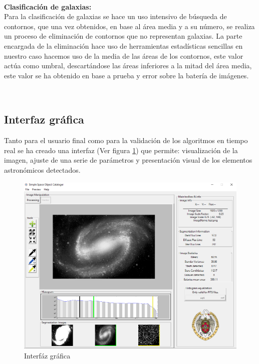 	\\
	\textbf{Clasificación de galaxias:}\\
	Para la clasificación de galaxias se hace un uso intensivo de búsqueda de contornos, que una vez obtenidos, en base al área media y a su número, se realiza un proceso de eliminación de contornos que no representan galaxias. La parte encargada de la eliminación hace uso de herramientas estadísticas sencillas en nuestro caso hacemos uso de la media de las áreas de los contornos, este valor actúa como umbral, descartándose las áreas inferiores a la mitad del área media, este valor se ha obtenido en base a prueba y error sobre la batería de imágenes.

	\\
	\subsection{Interfaz gráfica}\label{GUI}
	Tanto para el usuario final como para la validación de los algoritmos en tiempo real se ha creado una interfaz (Ver figura \ref{fig:GUI_limpia}) que permite: visualización de la imagen, ajuste de una serie de parámetros y presentación visual de los elementos astronómicos detectados.\\
	\begin{figure}[!htb]
		\centering
		\includegraphics[width=1\textwidth]{images/gui/general.png}
		\caption{\label{fig:GUI_limpia}Interfáz gráfica}
	\end{figure}

